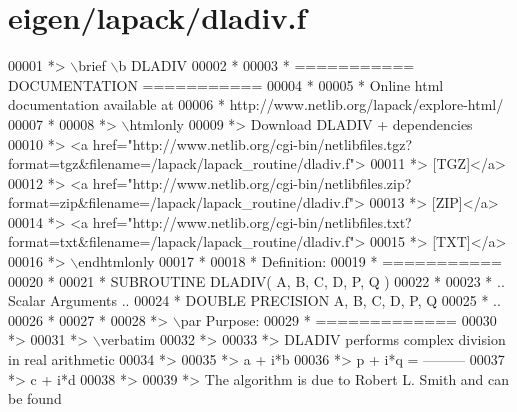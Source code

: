 \hypertarget{eigen_2lapack_2dladiv_8f_source}{}\section{eigen/lapack/dladiv.f}
\label{eigen_2lapack_2dladiv_8f_source}

\begin{DoxyCode}
00001 \textcolor{comment}{*> \(\backslash\)brief \(\backslash\)b DLADIV}
00002 \textcolor{comment}{*}
00003 \textcolor{comment}{*  =========== DOCUMENTATION ===========}
00004 \textcolor{comment}{*}
00005 \textcolor{comment}{* Online html documentation available at }
00006 \textcolor{comment}{*            http://www.netlib.org/lapack/explore-html/ }
00007 \textcolor{comment}{*}
00008 \textcolor{comment}{*> \(\backslash\)htmlonly}
00009 \textcolor{comment}{*> Download DLADIV + dependencies }
00010 \textcolor{comment}{*> <a
       href="http://www.netlib.org/cgi-bin/netlibfiles.tgz?format=tgz&filename=/lapack/lapack\_routine/dladiv.f"> }
00011 \textcolor{comment}{*> [TGZ]</a> }
00012 \textcolor{comment}{*> <a
       href="http://www.netlib.org/cgi-bin/netlibfiles.zip?format=zip&filename=/lapack/lapack\_routine/dladiv.f"> }
00013 \textcolor{comment}{*> [ZIP]</a> }
00014 \textcolor{comment}{*> <a
       href="http://www.netlib.org/cgi-bin/netlibfiles.txt?format=txt&filename=/lapack/lapack\_routine/dladiv.f"> }
00015 \textcolor{comment}{*> [TXT]</a>}
00016 \textcolor{comment}{*> \(\backslash\)endhtmlonly }
00017 \textcolor{comment}{*}
00018 \textcolor{comment}{*  Definition:}
00019 \textcolor{comment}{*  ===========}
00020 \textcolor{comment}{*}
00021 \textcolor{comment}{*       SUBROUTINE DLADIV( A, B, C, D, P, Q )}
00022 \textcolor{comment}{* }
00023 \textcolor{comment}{*       .. Scalar Arguments ..}
00024 \textcolor{comment}{*       DOUBLE PRECISION   A, B, C, D, P, Q}
00025 \textcolor{comment}{*       ..}
00026 \textcolor{comment}{*  }
00027 \textcolor{comment}{*}
00028 \textcolor{comment}{*> \(\backslash\)par Purpose:}
00029 \textcolor{comment}{*  =============}
00030 \textcolor{comment}{*>}
00031 \textcolor{comment}{*> \(\backslash\)verbatim}
00032 \textcolor{comment}{*>}
00033 \textcolor{comment}{*> DLADIV performs complex division in  real arithmetic}
00034 \textcolor{comment}{*>}
00035 \textcolor{comment}{*>                       a + i*b}
00036 \textcolor{comment}{*>            p + i*q = ---------}
00037 \textcolor{comment}{*>                       c + i*d}
00038 \textcolor{comment}{*>}
00039 \textcolor{comment}{*> The algorithm is due to Robert L. Smith and can be found}

\end{DoxyCode}
